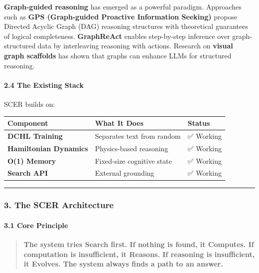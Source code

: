 \documentclass[
  11pt,
  a4paper,
]{article}
\begin{document}
\textbf{Graph-guided reasoning} has emerged as a powerful paradigm.
Approaches such as \textbf{GPS (Graph-guided Proactive Information
Seeking)} propose Directed Acyclic Graph (DAG) reasoning structures with
theoretical guarantees of logical completeness. \textbf{GraphReAct}
enables step-by-step inference over graph-structured data by
interleaving reasoning with actions. Research on \textbf{visual graph
scaffolds} has shown that graphs can enhance LLMs for structured
reasoning.

\paragraph{2.4 The Existing Stack}\label{the-existing-stack}

SCER builds on:

\begin{longtable}[]{@{}lll@{}}
\toprule\noalign{}
Component & What It Does & Status \\
\midrule\noalign{}
\endhead
\bottomrule\noalign{}
\endlastfoot
\textbf{DCHL Training} & Separates text from random & ✅ Working \\
\textbf{Hamiltonian Dynamics} & Physics-based reasoning & ✅ Working \\
\textbf{O(1) Memory} & Fixed-size cognitive state & ✅ Working \\
\textbf{Search API} & External grounding & ✅ Working \\
\end{longtable}

\begin{center}\rule{0.5\linewidth}{0.5pt}\end{center}

\subsubsection{3. The SCER Architecture}\label{the-scer-architecture}

\paragraph{3.1 Core Principle}\label{core-principle-1}

\begin{quote}
\textbf{The system tries Search first. If nothing is found, it Computes.
If computation is insufficient, it Reasons. If reasoning is
insufficient, it Evolves. The system always finds a path to an answer.}
\end{quote}
\end{document}

